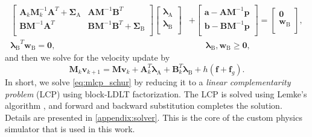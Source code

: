 \documentclass[preprint,12pt]{elsarticle}
\let\vec\bm
\let\mat\mathbf
\numberwithin{equation}{section}
\def\tA{\text{A}}
\def\tB{\text{B}}
\def\lambdaa{\vec{\lambda}_{\text{A}}}
\def\lambdab{\vec{\lambda}_{\text{B}}}
\def\drydiagonal{\mat{\Sigma}_\text{B}}
\newcommand{\complementarityalign}[2]{{#1}^T{#2}=\vec{0}, &\qquad #1, #2 \geq \vec{0}}
\begin{document}
\begin{equation}
    \label{eq:mlcp_schur}
    \begin{aligned}
        \begin{bmatrix}
            \mat{A}_k \mat{M}^{-1}_k \mat{A}^T + \mat{\Sigma}_\tA & \mat{A}\mat{M}^{-1}\mat{B}^T                \\
            \mat{B}\mat{M}^{-1}\mat{A}^T                        & \mat{B}\mat{M}^{-1}\mat{B}^T + \drydiagonal \\
        \end{bmatrix}
        \begin{bmatrix}
            \lambdaa \\
            \lambdab \\
        \end{bmatrix}
         & +
        \begin{bmatrix}
            \vec{a} - \mat{A}\mat{M}^{-1} \vec{p} \\
            \vec{b} - \mat{B}\mat{M}^{-1} \vec{p} \\
        \end{bmatrix}
        =
        \begin{bmatrix}
            \vec{0} \\
            \vec{w}_{\tB}     \\
        \end{bmatrix}, \\
        \complementarityalign{\lambdab}{\vec{w}_{\tB}},
    \end{aligned}
\end{equation}
and then we solve for the velocity update by
\begin{equation}
    \label{eq:velocity_update}
    \mat{M}_k \vec{v}_{k+1} = \mat{M}\vec{v}_k + \mat{A}_k^T \lambdaa + \mat{B}_k^T \lambdab + h (\vec{f} + \vec{f}_g).
\end{equation}
In short, we solve \eqref{eq:mlcp_schur} by reducing it to a \emph{linear complementarity problem} (LCP) using block-LDLT factorization.
The LCP is solved using Lemke's algorithm \cite{cottle2009linear}, and forward and backward substitution completes the solution.
Details are presented in \ref{appendix:solver}.
This is the core of the custom physics simulator that is used in this work.
\end{document}
